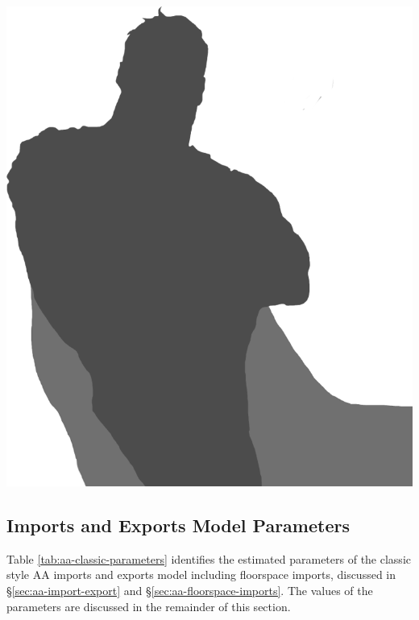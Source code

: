 \begin{table}
\centering
\includegraphics[scale=0.5]{graphics/placeholder-male-superhero-c}
\end{table}

\subsection{Imports and Exports Model Parameters}
Table \ref{tab:aa-classic-parameters} identifies the estimated parameters of the classic style AA imports and exports model including floorspace imports, discussed in \S\ref{sec:aa-import-export} and \S\ref{sec:aa-floorspace-imports}. The values of the parameters are discussed in the remainder of this section.

